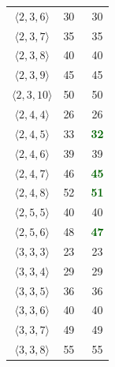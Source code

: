 \begin{table}[h]
\begin{center}
{\begin{tabular}{ccc}
    $\langle 2, 3, 6 \rangle$ & 30~\citep{smirnov2013bilinear} & 30 \\ 
    $\langle 2, 3, 7 \rangle$ & 35~\citep{smirnov2013bilinear} & 35 \\ 
    $\langle 2, 3, 8 \rangle$ & 40~\citep{smirnov2013bilinear} & 40 \\ 
    $\langle 2, 3, 9 \rangle$ & 45~\citep{smirnov2013bilinear} & 45 \\ 
    $\langle 2, 3, 10 \rangle$ & 50~\citep{smirnov2013bilinear} & 50 \\ 
    $\langle 2, 4, 4 \rangle$ & 26~\citep{smirnov2013bilinear} & 26 \\ 
    $\langle 2, 4, 5 \rangle$ & 33~\citep{hopcroft} & \textcolor{darkgreen}{\textbf{32}} \\
    $\langle 2, 4, 6 \rangle$ & 39~\citep{smirnov2013bilinear} & 39 \\ 
    $\langle 2, 4, 7 \rangle$ & 46~\citep{smirnov2013bilinear} & \textcolor{darkgreen}{\textbf{45}} \\
    $\langle 2, 4, 8 \rangle$ & 52~\citep{smirnov2013bilinear} & \textcolor{darkgreen}{\textbf{51}} \\
    $\langle 2, 5, 5 \rangle$ & 40~\citep{smirnov2013bilinear} & 40 \\ 
    $\langle 2, 5, 6 \rangle$ & 48~\citep{smirnov2013bilinear} & \textcolor{darkgreen}{\textbf{47}} \\ 
    $\langle 3, 3, 3 \rangle$ & 23~\citep{laderman}   & 23   \\
    $\langle 3, 3, 4 \rangle$ & 29~\citep{smirnov2013bilinear} & 29 \\ 
    $\langle 3, 3, 5 \rangle$ & 36~\citep{smirnov2013bilinear} & 36 \\ 
    $\langle 3, 3, 6 \rangle$ & 40~\citep{smirnov2013bilinear} & 40 \\ 
    $\langle 3, 3, 7 \rangle$ & 49~\citep{smirnov2013bilinear} & 49 \\ 
    $\langle 3, 3, 8 \rangle$ & 55~\citep{smirnov2013bilinear} & 55 \\ 
    \end{tabular}
    }
\end{center}
\end{table}
